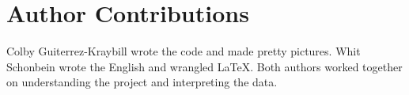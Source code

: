 \section*{Author Contributions}
Colby Guiterrez-Kraybill wrote the code and made pretty pictures. Whit Schonbein wrote the English and wrangled \LaTeX. Both authors 
worked together on understanding the project and interpreting the data.


